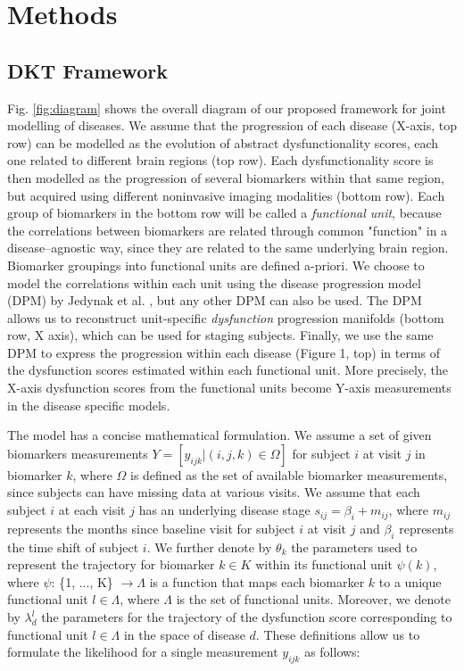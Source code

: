 \section{Methods}
\label{sec:dktMet}


\subsection{DKT Framework}
\label{sec:dktMethFramework}
\newcommand{\lp}{\lambda_{d_i}^{\psi(k)}}
\newcommand{\lpuu}{\lambda_{d_i}^{\psi(k),(u)}}
\newcommand{\lpum}{\lambda_{d_i}^{\psi(k),(u-1)}}


Fig. \ref{fig:diagram} shows the overall diagram of our proposed framework for joint modelling of diseases. We assume that the progression of each disease (X-axis, top row) can be modelled as the evolution of abstract dysfunctionality scores, each one related to different brain regions (top row). Each dysfunctionality score is then modelled as the progression of several biomarkers within that same region, but acquired using different noninvasive imaging modalities (bottom row). Each group of biomarkers in the bottom row will be called a \emph{functional unit}, because the correlations between biomarkers are related through common "function" in a disease--agnostic way, since they are related to the same underlying brain region. Biomarker groupings into functional units are defined a-priori. We choose to model the correlations within each unit using the disease progression model (DPM) by Jedynak et al. \cite{jedynak2012computational}, but any other DPM can also be used. The DPM allows us to reconstruct unit-specific \emph{dysfunction} progression manifolds (bottom row, X axis), which can be used for staging subjects. Finally, we use the same DPM to express the progression within each disease (Figure 1, top) in terms of the dysfunction scores estimated within each functional unit. More precisely, the X-axis dysfunction scores from the functional units become Y-axis measurements in the disease specific models.

The model has a concise mathematical formulation. We assume a set of given biomarkers measurements $Y = [y_{ijk} | (i,j,k) \in \Omega]$ for subject $i$ at visit $j$ in biomarker $k$, where $\Omega$ is defined as the set of available biomarker measurements, since subjects can have missing data at various visits. We assume that each subject $i$ at each visit $j$ has an underlying disease stage $s_{ij} = \beta_i + m_{ij}$, where $m_{ij}$ represents the months since baseline visit for subject $i$ at visit $j$ and $\beta_i$ represents the time shift of subject $i$. We further denote by $\theta_k$ the parameters used to represent the trajectory for biomarker $k \in K$ within its functional unit $\psi(k)$, where $\psi$: \{1, ..., K\} $ \rightarrow \Lambda$ is a function that maps each biomarker $k$ to a unique functional unit $l \in \Lambda$, where $\Lambda$ is the set of functional units. Moreover, we denote by $\lambda_d^l$ the parameters for the trajectory of the dysfunction score corresponding to functional unit $l \in \Lambda$ in the space of disease $d$. These definitions allow us to formulate the likelihood for a single measurement $y_{ijk}$ as follows:


